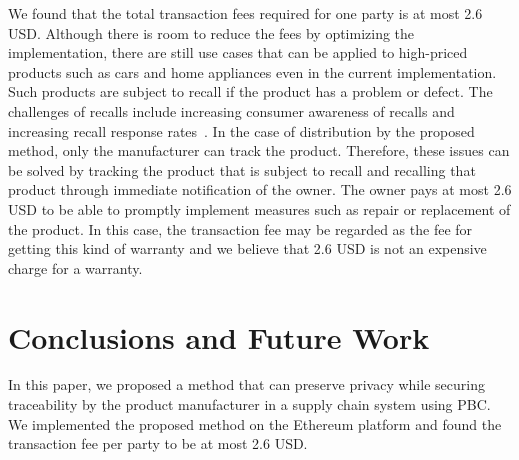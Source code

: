 \documentclass[conference]{IEEEtran}
\begin{document}
We found that the total transaction fees required for one party is at most 2.6 USD. 
Although there is room to reduce the fees by optimizing the implementation, there are still use cases that can be applied to high-priced products such as cars and home appliances even in the current implementation.
Such products are subject to recall if the product has a problem or defect.
The challenges of recalls include increasing consumer awareness of recalls and increasing recall response rates~\cite{OECD2018}.
In the case of distribution by the proposed method, only the manufacturer can track the product.
Therefore, these issues can be solved by tracking the product that is subject to recall and recalling that product through immediate notification of the owner.
The owner pays at most 2.6 USD to be able to promptly implement measures such as repair or replacement of the product. In this case, the transaction fee may be regarded as the fee for getting this kind of warranty and we believe that 2.6 USD is not an expensive charge for a warranty.



\section{Conclusions and Future Work}
\label{sec:conclusions}
In this paper, we proposed a method that can preserve privacy while securing traceability by the product manufacturer in a supply chain system using PBC.
We implemented the proposed method on the Ethereum platform and found the transaction fee per party to be at most 2.6 USD.
\end{document}
